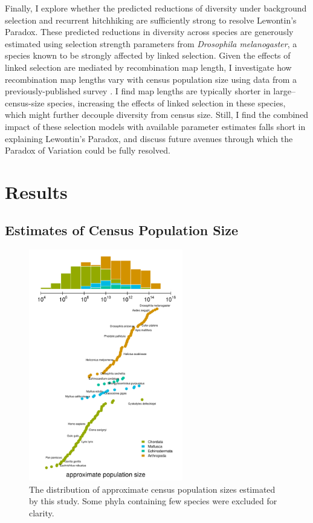 \documentclass[11pt]{article}
\begin{document}
Finally, I explore whether the predicted reductions of diversity under
background selection and recurrent hitchhiking are sufficiently strong 
to resolve Lewontin's Paradox. These predicted reductions in diversity across
species are generously estimated using selection strength parameters from
\emph{Drosophila melanogaster}, a species known to be strongly affected by
linked selection. Given the effects of linked selection are mediated by
recombination map length, I investigate how recombination map lengths vary with
census population size using data from a previously-published survey
\parencite{Stapley2017-fs}. I find map lengths are typically shorter in
large--census-size species, increasing the effects of linked selection in these
species, which might further decouple diversity from census size. Still, I find
the combined impact of these selection models with available parameter
estimates falls short in explaining Lewontin's Paradox, and discuss future
avenues through which the Paradox of Variation could be fully resolved.

\section*{Results}

\subsection*{Estimates of Census Population Size}

\begin{figure}[t!]
  \centering
  \includegraphics[width=0.6\textwidth]{figures/Nc_figure.pdf}
  \caption{
     The distribution of approximate census population sizes estimated by this
     study. Some phyla containing few species were excluded for clarity.}
\label{fig:figure-nc}
\end{figure}
\end{document}
